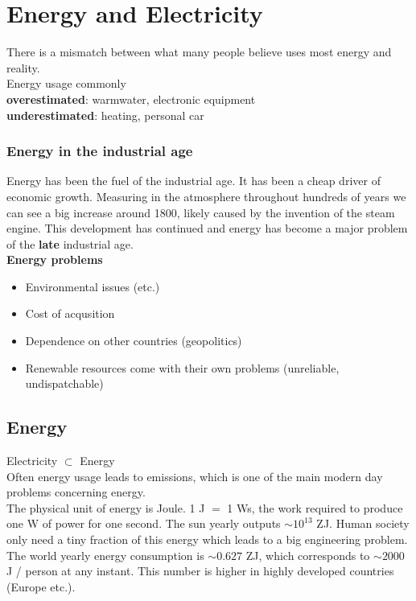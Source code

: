 \section{Energy and Electricity}
There is a mismatch between what many people believe uses most energy and reality.\\
Energy usage commonly\\
\textbf{overestimated}: warmwater, electronic equipment\\
\textbf{underestimated}: heating, personal car\\

\subsubsection{Energy in the industrial age}
Energy has been the fuel of the industrial age.
It has been a cheap driver of economic growth.
Measuring \cotwo in the atmosphere throughout hundreds of years we can see a big increase around 1800, likely caused by the invention of the steam engine. This development has continued and energy has become a major problem of the \textbf{late} industrial age.\\

\textbf{Energy problems}
\begin{itemize}
    \item Environmental issues (\cotwo etc.)
    \item Cost of acqusition
    \item Dependence on other countries (geopolitics)
    \item Renewable resources come with their own problems (unreliable, undispatchable)
\end{itemize}

\subsection{Energy}
Electricity $\subset$ Energy\\

Often energy usage leads to \cotwo emissions, which is one of the main modern day problems concerning energy.\\

The physical unit of energy is Joule. 1 J $=$ 1 Ws, the work required to produce one W of power for one second.
The sun yearly outputs $\sim 10^{13}$ ZJ.
Human society only need a tiny fraction of this energy which leads to a big engineering problem.
The world yearly energy consumption is $\sim 0.627$ ZJ, which corresponds to $\sim 2000$ J / person at any instant.
This number is higher in highly developed countries (Europe etc.).\\

